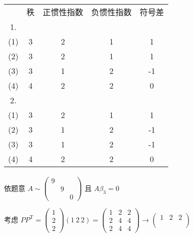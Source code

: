 	 \paragraph{} %
		 \begin{tabular}{ccccc}
			     & 秩 & 正惯性指数 & 负惯性指数 & 符号差 \\
			 1.                            \\
			 (1) & 3 & 2     & 1     & 1   \\
			 (2) & 3 & 2     & 1     & 1   \\
			 (3) & 3 & 1     & 2     & -1  \\
			 (4) & 4 & 2     & 2     & 0   \\
			 2.                            \\
			 (1) & 3 & 2     & 1     & 1   \\
			 (2) & 3 & 1     & 2     & -1  \\
			 (3) & 3 & 1     & 2     & -1  \\
			 (4) & 4 & 2     & 2     & 0
		 \end{tabular}












	 \paragraph{} %
		 依题意 \( A \sim \begin{pmatrix}
			 9 &   &   \\
			   & 9 &   \\
			   &   & 0
		 \end{pmatrix} \) 且 \( A\beta_{3} = 0 \)

		 考虑 \( PP^{\mathrm{T}} = \begin{pmatrix}
			 1 \\
			 2 \\
			 2
		 \end{pmatrix}(1\ 2\ 2) = \begin{pmatrix}
			 1 & 2 & 2 \\
			 2 & 4 & 4 \\
			 2 & 4 & 4
		 \end{pmatrix} \rightarrow \begin{pmatrix}
			 1 & 2 & 2 \\
			   &   &   \\
			   &   &
		 \end{pmatrix} \)


